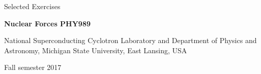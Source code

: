 \documentclass[%
oneside,                 %
final,                   %
10pt]{article}
\begin{document}

\newcommand{\exercisesection}[1]{\subsection*{#1}}






\thispagestyle{empty}

\begin{center}
{\LARGE\bf
\begin{spacing}{1.25}
Selected Exercises
\end{spacing}
}
\end{center}


\begin{center}
{\bf Nuclear Forces PHY989}
\end{center}

    \begin{center}
\centerline{{\small National Superconducting Cyclotron Laboratory and Department of Physics and Astronomy, Michigan State University, East Lansing, USA}}
\end{center}
    

\begin{center}
Fall semester 2017
\end{center}

\vspace{1cm}
\end{document}
